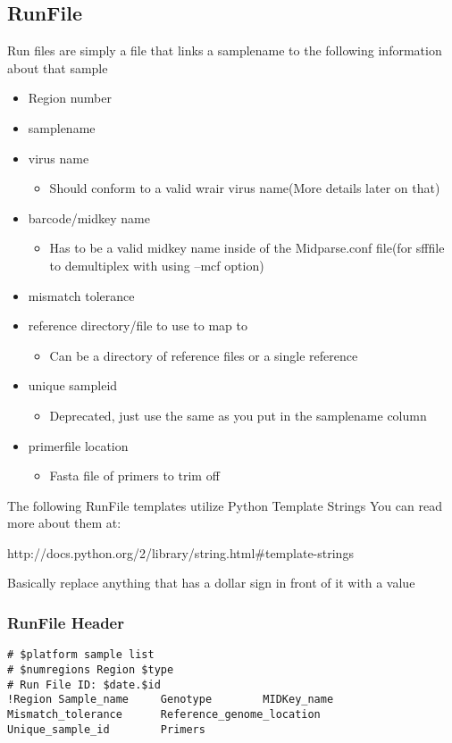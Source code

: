 \documentclass{article}
\begin{document}
 \subsection{RunFile}
Run files are simply a file that links a samplename to the following information about that sample
\begin{itemize}
 \item Region number
 \item samplename
 \item virus name
  \begin{itemize}
   \item Should conform to a valid wrair virus name(More details later on that)
  \end{itemize}
 \item barcode/midkey name
  \begin{itemize}
   \item Has to be a valid midkey name inside of the Midparse.conf file(for sfffile to demultiplex with using --mcf option)
  \end{itemize}
 \item mismatch tolerance
 \item reference directory/file to use to map to
  \begin{itemize}
   \item Can be a directory of reference files or a single reference
  \end{itemize}
 \item unique sampleid
  \begin{itemize}
   \item Deprecated, just use the same as you put in the samplename column
  \end{itemize}
 \item primerfile location
  \begin{itemize}
   \item Fasta file of primers to trim off
  \end{itemize}
\end{itemize}

The following RunFile templates utilize Python Template Strings
You can read more about them at:

http://docs.python.org/2/library/string.html\#template-strings

Basically replace anything that has a dollar sign in front of it with a value

{\tiny
\subsubsection{RunFile Header}
\begin{lstlisting}
# $platform sample list
# $numregions Region $type
# Run File ID: $date.$id
!Region Sample_name     Genotype        MIDKey_name     Mismatch_tolerance      Reference_genome_location       Unique_sample_id        Primers
\end{lstlisting}
}
\end{document}
